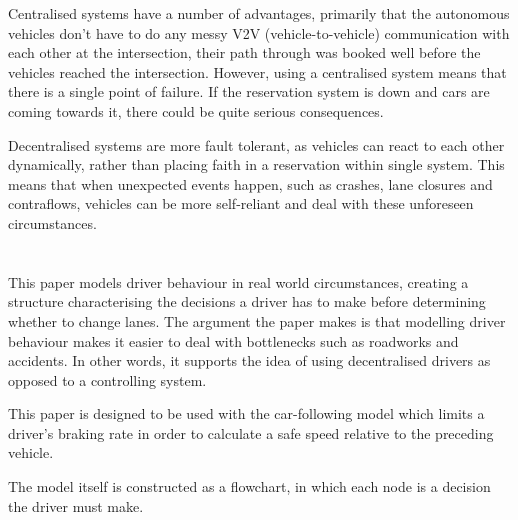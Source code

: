 Centralised systems have a number of advantages, primarily that the autonomous vehicles don't have to do any messy V2V (vehicle-to-vehicle) communication with each other at the intersection, their path through was booked well before the vehicles reached the intersection. However, using a centralised system means that there is a single point of failure. If the reservation system is down and cars are coming towards it, there could be quite serious consequences.

Decentralised systems are more fault tolerant, as vehicles can react to each other dynamically, rather than placing faith in a reservation within single system. This means that when unexpected events happen, such as crashes, lane closures and contraflows, vehicles can be more self-reliant and deal with these unforeseen circumstances.

\section{}
\label{sec:Gipps1986}
This paper models driver behaviour in real world circumstances, creating a structure characterising the decisions a driver has to make before determining whether to change lanes. The argument the paper makes is that modelling driver behaviour makes it easier to deal with bottlenecks such as roadworks and accidents. In other words, it supports the idea of using decentralised drivers as opposed to a controlling system.

This paper is designed to be used with the car-following model \citep{Gipps1981} which limits a driver's braking rate in order to calculate a safe speed relative to the preceding vehicle.


The model itself is constructed as a flowchart, in which each node is a decision the driver must make.

